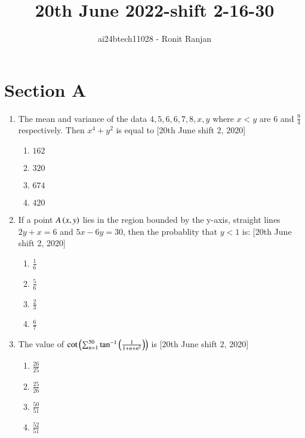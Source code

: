 \documentclass[journal,12pt,twocolumn]{IEEEtran}
\theoremstyle{remark}
\begin{document}

\vspace{3cm}

\title{20th June 2022-shift 2-16-30}
\author{ai24btech11028 - Ronit Ranjan}
\maketitle
\newpage
\bigskip

\section*{Section A}

\begin{enumerate}
    \item The mean and variance of the data $4, 5, 6, 6, 7, 8, x, y$ where $x < y$ are $6$ and $\frac{9}{4}$ respectively. Then $x^4 + y^2$ is equal to \hfill{[20th June shift 2, 2020]}
    \begin{multicols}{2}
    \begin{enumerate}
        \item $162$
        \item $320$
        \item $674$
        \item $420$
    \end{enumerate}
    \end{multicols}

    \item If a point $A\left(x, y\right)$ lies in the region bounded by the y-axis, straight lines $2y + x = 6$ and $5x - 6y = 30$, then the probablity that $y<1$ is: \hfill{[20th June shift 2, 2020]}
    \begin{multicols}{2}
    \begin{enumerate}
        \item $\frac{1}{6}$
        \item $\frac{5}{6}$
        \item $\frac{2}{3}$
        \item $\frac{6}{7}$
    \end{enumerate}
    \end{multicols}    

    \item The value of $\cot \left( \sum_{n=1}^{50} \tan^{-1} \left( \frac{1}{1+n+n^2} \right)\right)$ is  \hfill{[20th June shift 2, 2020]}
    \begin{multicols}{2}
    \begin{enumerate}
        \item $\frac{26}{25}$
        \item $\frac{25}{26}$
        \item $\frac{50}{51}$
        \item $\frac{52}{51}$
    \end{enumerate}
    \end{multicols}    


\end{enumerate}
\end{document}

